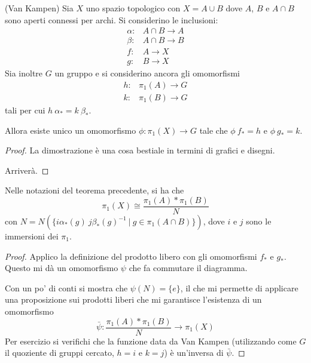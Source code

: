 \begin{thm}
  (Van Kampen)
    Sia $X$ uno spazio topologico con $X=A\cup B$ dove $A$, $B$ e $A\cap B$ sono aperti connessi per archi. Si considerino le inclusioni:
    \begin{align*}
        \alpha\colon& A\cap B \longrightarrow A\\
        \beta\colon& A\cap B \longrightarrow B\\
        f\colon& A \longrightarrow X\\
        g\colon& B \longrightarrow X
    \end{align*}
    Sia inoltre $G$ un gruppo e si considerino ancora gli omomorfismi
    \begin{align*}
        h\colon& \pi_1(A)\longrightarrow G\\
        k\colon& \pi_1(B)\longrightarrow G
    \end{align*}
    tali per cui $h\ \alpha_* = k\ \beta_*$.

    Allora esiste unico un omomorfismo $\phi\colon\pi_1(X)\longrightarrow G$ tale che $\phi\ f_* = h$ e $\phi\ g_*=k$.
\end{thm}

\begin{proof}
    La dimostrazione \`e una cosa bestiale in termini di grafici e disegni.

     Arriver\`a.
\end{proof}

\begin{cor}
    Nelle notazioni del teorema precedente, si ha che
    \[
        \pi_1(X)\cong \frac{\pi_1(A) * \pi_1(B)}{N}
    \]
    con $N = N(\{i\alpha_*(g)\ j \beta_*(g)^{-1}\ |\ g\in\pi_1(A\cap B)\})$, dove $i$ e $j$ sono le immersioni dei $\pi_1$.
\end{cor}
\begin{proof}
    Applico la definizione del prodotto libero con gli omomorfismi $f_*$ e $g_*$. Questo mi d\`a un omomorfismo $\psi$ che fa commutare il diagramma.
    \begin{center}\end{center}
    Con un po' di conti si mostra che $\psi(N)=\{e\}$, il che mi permette di applicare una proposizione sui prodotti liberi che mi garantisce l'esistenza di un omomorfismo
    \[
        \bar{\psi}\colon \frac{\pi_1(A) * \pi_1(B)}{N} \longrightarrow \pi_1(X)
    \]
    Per esercizio si verifichi che la funzione data da Van Kampen (utilizzando come $G$ il quoziente di gruppi cercato, $h=i$ e $k=j$) \`e un'inversa di $\bar{\psi}$.
\end{proof}


